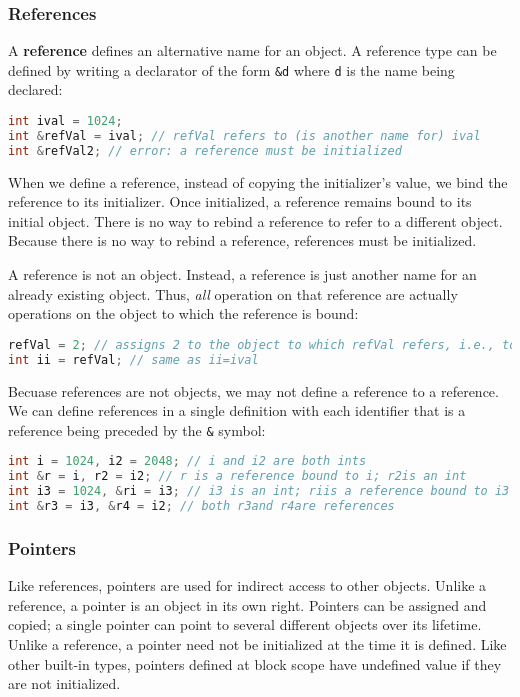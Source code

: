 \subsubsection{References}

A \textbf{reference} defines an alternative name for an object. A reference type can be defined by writing a declarator of the form \texttt{\&d} where \texttt{d} is the name being declared:
\begin{lstlisting}[language=C++]
int ival = 1024; 
int &refVal = ival; // refVal refers to (is another name for) ival 
int &refVal2; // error: a reference must be initialized
\end{lstlisting}
When we define a reference, instead of copying the initializer’s value, we bind the reference to its initializer. Once initialized, a reference remains bound to its initial object. There is no way to rebind a reference to refer to a different object. Because there is no way to rebind a reference, references must be initialized.

A reference is not an object. Instead, a reference is just another name for an already existing object. Thus, \textit{all} operation on that reference are actually operations on the object to which the reference is bound:
\begin{lstlisting}[language=C++]
refVal = 2; // assigns 2 to the object to which refVal refers, i.e., to ival 
int ii = refVal; // same as ii=ival
\end{lstlisting}

Becuase references are not objects, we may not define a reference to a reference.
We can define references in a single definition with each identifier that is a reference being preceded by the \texttt{\&} symbol:
\begin{lstlisting}[language=C++]
int i = 1024, i2 = 2048; // i and i2 are both ints 
int &r = i, r2 = i2; // r is a reference bound to i; r2is an int 
int i3 = 1024, &ri = i3; // i3 is an int; riis a reference bound to i3 
int &r3 = i3, &r4 = i2; // both r3and r4are references
\end{lstlisting}

\subsubsection{Pointers}
Like references, pointers are used for indirect access to other objects. Unlike a reference, a pointer is an object in its own right. Pointers can be assigned and copied; a single pointer can point to several different objects over its lifetime. Unlike a reference, a pointer need not be initialized at the time it is defined. Like other built-in types, pointers defined at block scope have undefined value if they are not initialized.

